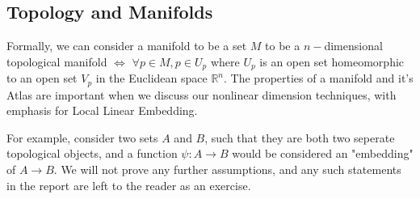 \subsection{Topology and Manifolds}

Formally, we can consider a manifold to be a set $M$ to be a $n-$dimensional topological manifold $\iff$ $\forall p\in M,p\in U_p$ where $U_p$ is an open set homeomorphic to an open set $V_p$ in the Euclidean space $\mathbb{R}^n.$ The properties of a manifold and it's Atlas are important when we discuss our nonlinear dimension techniques, with emphasis for Local Linear Embedding.

For example, consider two sets $A$ and $B$, such that they are both two seperate topological objects, and a function $\psi:A\to B$ would be considered an "embedding" of $A\to B$. We will not prove any further assumptions, and any such statements in the report are left to the reader as an exercise. 
